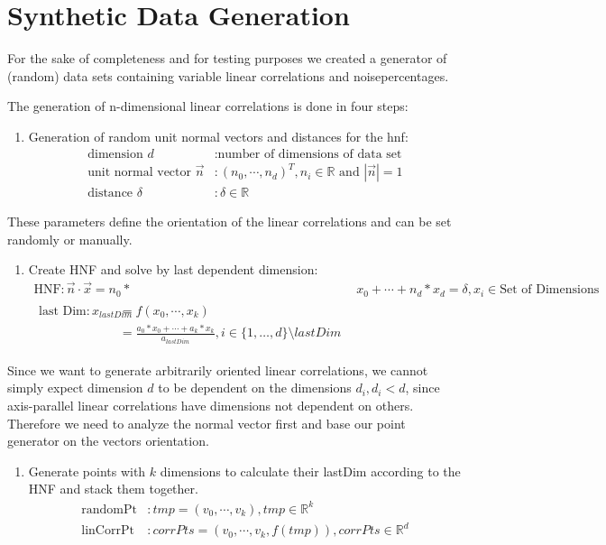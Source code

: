 \chapter{Synthetic Data Generation}
\label{sec:datagen}
For the sake of completeness and for testing purposes we created a generator of (random) data sets containing variable linear correlations and noisepercentages.

The generation of n-dimensional linear correlations is done in four steps:
\begin{enumerate}
\item Generation of random unit normal vectors and distances for the \acrfull{hnf}: 
\begin{align}
\text{dimension }d&: \text{number of dimensions of data set}\\
\text{unit normal vector } \vec{n}&: (n_0, \cdots, n_d )^T, n_i \in \mathbb{R} \text{ and } |\vec{n}| = 1\\
\text{distance }\delta&: \delta \in \mathbb{R}
\end{align}
\end{enumerate}

These parameters define the orientation of the linear correlations and can be set randomly or manually.

\begin{enumerate}[resume]

\item Create HNF and solve by last dependent dimension:
\begin{align}
    \text{HNF}: \vec{n} \cdot \vec{x} = n_0 * &x_0 + \cdots + n_d * x_d = \delta, x_i \in \text{Set of Dimensions}\\
    \begin{split}
        \text{last Dim}: x_{lastDim} &= f(x_0, \cdots, x_{k}) \\
        &= \frac{a_0 * x_0 + \cdots + a_{k} * x_{k}}{a_{lastDim}}, i \in \{1,\dotsc,d\}\setminus {lastDim}
    \end{split}
\end{align}
\end{enumerate}

Since we want to generate arbitrarily oriented linear correlations, we cannot simply expect dimension $d$ to be dependent on the dimensions $d_i, d_i < d$, since axis-parallel linear correlations have dimensions not dependent on others. Therefore we need to analyze the normal vector first and base our point generator on the vectors orientation.

\begin{enumerate}[resume]

\item Generate points with $k$ dimensions to calculate their lastDim according to the HNF and stack them together.
\begin{align}
    \text{randomPt}&: tmp = (v_0, \cdots, v_{k}), tmp \in \mathbb{R}^{k}\\
    \text{linCorrPt}&: corrPts =  (v_0, \cdots, v_{k}, f(tmp)), corrPts \in \mathbb{R}^{d}
\end{align}
\end{enumerate}



